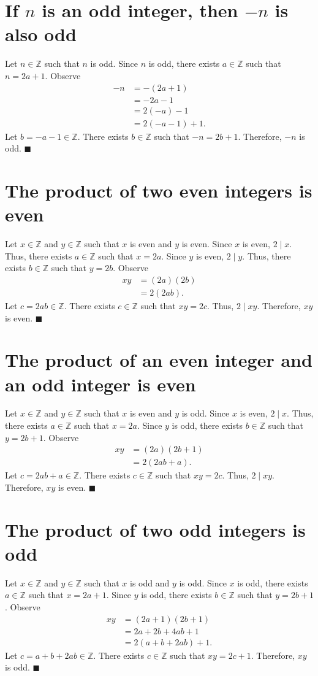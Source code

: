 \documentclass[12pt]{article}
\begin{document}
\section{If $n$ is an odd integer, then $-n$ is also odd}
Let $n\in\mathbb{Z}$ such that $n$ is odd. Since $n$ is odd, there exists $a\in\mathbb{Z}$ such that $n=2a+1$. Observe
\begin{align*}
-n
&=-(2a+1)\\
&=-2a-1\\
&=2(-a)-1\\
&=2(-a-1)+1.
\end{align*}
Let $b=-a-1\in\mathbb{Z}$. There exists $b\in\mathbb{Z}$ such that $-n=2b+1$. Therefore, $-n$ is odd. $\blacksquare$
\section{The product of two even integers is even}
Let $x\in\mathbb{Z}$ and $y\in\mathbb{Z}$ such that $x$ is even and $y$ is even. Since $x$ is even, $2 \mid x$. Thus, there exists $a\in\mathbb{Z}$ such that $x=2a$. Since $y$ is even, $2 \mid y$. Thus, there exists $b\in\mathbb{Z}$ such that $y=2b$. Observe
\begin{align*}
xy
&=(2a)(2b)\\
&=2(2ab).
\end{align*}
Let $c=2ab\in\mathbb{Z}$. There exists $c\in\mathbb{Z}$ such that $xy=2c$. Thus, $2 \mid xy$. Therefore, $xy$ is even. $\blacksquare$
\section{The product of an even integer and an odd integer is even}
Let $x\in\mathbb{Z}$ and $y\in\mathbb{Z}$ such that $x$ is even and $y$ is odd. Since $x$ is even, $2 \mid x$. Thus, there exists $a\in\mathbb{Z}$ such that $x=2a$. Since $y$ is odd, there exists $b\in\mathbb{Z}$ such that $y=2b+1$. Observe
\begin{align*}
xy
&=(2a)(2b+1)\\
&=2(2ab+a).
\end{align*}
Let $c=2ab+a\in\mathbb{Z}$. There exists $c\in\mathbb{Z}$ such that $xy=2c$. Thus, $2 \mid xy$. Therefore, $xy$ is even. $\blacksquare$
\section{The product of two odd integers is odd}
Let $x\in\mathbb{Z}$ and $y\in\mathbb{Z}$ such that $x$ is odd and $y$ is odd. Since $x$ is odd, there exists $a\in\mathbb{Z}$ such that $x=2a+1$. Since $y$ is odd, there exists $b\in\mathbb{Z}$ such that $y=2b+1$. Observe
\begin{align*}
xy
&=(2a+1)(2b+1)\\
&=2a+2b+4ab+1\\
&=2(a+b+2ab)+1.
\end{align*}
Let $c=a+b+2ab\in\mathbb{Z}$. There exists $c\in\mathbb{Z}$ such that $xy=2c+1$. Therefore, $xy$ is odd. $\blacksquare$
\end{document}
